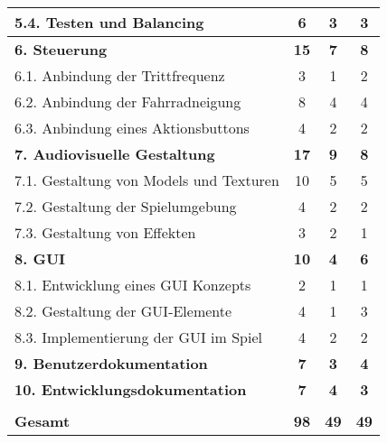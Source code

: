 \begin{tabularx}{\textwidth}{|X|c|c|c|}
5.4. Testen und Balancing & 6 & 3 & 3 \\ \hline
\textbf{6. Steuerung} & \textbf{15} & \textbf{7} & \textbf{8} \\ \hline
6.1. Anbindung der Trittfrequenz & 3 & 1 & 2 \\ \hline
6.2. Anbindung der Fahrradneigung & 8 & 4 & 4 \\ \hline
6.3. Anbindung eines Aktionsbuttons & 4 & 2 & 2 \\ \hline
\textbf{7. Audiovisuelle Gestaltung} & \textbf{17} & \textbf{9} & \textbf{8} \\ \hline
7.1. Gestaltung von Models und Texturen & 10 & 5 & 5 \\ \hline
7.2. Gestaltung der Spielumgebung & 4 & 2 & 2 \\ \hline
7.3. Gestaltung von Effekten & 3 & 2 & 1 \\ \hline
\textbf{8. GUI} & \textbf{10} & \textbf{4} & \textbf{6} \\ \hline
8.1. Entwicklung eines GUI Konzepts & 2 & 1 & 1 \\ \hline
8.2. Gestaltung der GUI-Elemente & 4 & 1 & 3 \\ \hline
8.3. Implementierung der GUI im Spiel & 4 & 2 & 2 \\ \hline
\textbf{9. Benutzerdokumentation} & \textbf{7} & \textbf{3} & \textbf{4} \\ \hline
\textbf{10. Entwicklungsdokumentation} & \textbf{7} & \textbf{4} & \textbf{3} \\ \hline
 &  &  &  \\ \hline
\textbf{Gesamt} & \textbf{98} & \textbf{49} & \textbf{49} \\ \hline
\end{tabularx}
